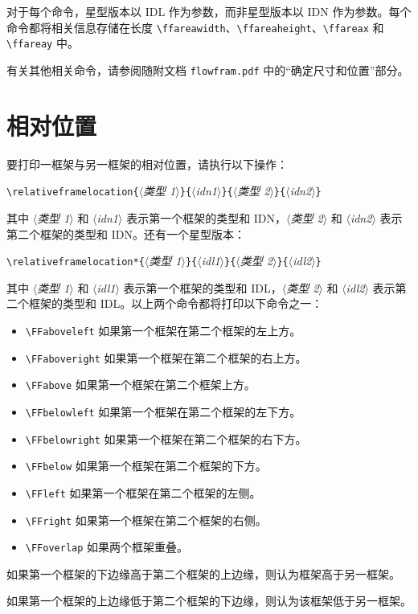 \documentclass[a4paper]{book}%
\newcommand{\filename}[1]{\texttt{#1}}
\newcommand{\meta}[1]{\textnormal{\ensuremath{\langle}\makebox[0pt][l]{}\emph{#1}\makebox[0pt][l]{}\ensuremath{\rangle}}}
\begin{document}
对于每个命令，星型版本以 IDL 作为参数，而非星型版本以 IDN 作为参数。每个命令都将相关信息存储在长度 \verb|\ffareawidth|、\verb|\ffareaheight|、\verb|\ffareax| 和 \verb|\ffareay| 中。

有关其他相关命令，请参阅随附文档 \filename{flowfram.pdf} 中的“确定尺寸和位置”部分。
\section{相对位置}%
要打印一框架与另一框架的相对位置，请执行以下操作：
\begin{mdframed}
    \verb|\relativeframelocation{|\meta{类型 1}\verb|}{|\meta{idn1}\verb|}{|\meta{类型 2}\verb|}{|\meta{idn2}\verb|}|
\end{mdframed}
其中 \meta{类型 1} 和 \meta{idn1} 表示第一个框架的类型和 IDN，\meta{类型 2} 和 \meta{idn2} 表示第二个框架的类型和 IDN。还有一个星型版本：
\begin{mdframed}
    \verb|\relativeframelocation*{|\meta{类型 1}\verb|}{|\meta{idl1}\verb|}{|\meta{类型 2}\verb|}{|\meta{idl2}\verb|}|
\end{mdframed}
其中 \meta{类型 1} 和 \meta{idl1} 表示第一个框架的类型和 IDL，\meta{类型 2} 和 \meta{idl2} 表示第二个框架的类型和 IDL。以上两个命令都将打印以下命令之一：
\begin{itemize}
    \item \verb|\FFaboveleft| 如果第一个框架在第二个框架的左上方。
    \item \verb|\FFaboveright| 如果第一个框架在第二个框架的右上方。
    \item \verb|\FFabove| 如果第一个框架在第二个框架上方。
    \item \verb|\FFbelowleft| 如果第一个框架在第二个框架的左下方。
    \item \verb|\FFbelowright| 如果第一个框架在第二个框架的右下方。
    \item \verb|\FFbelow| 如果第一个框架在第二个框架的下方。
    \item \verb|\FFleft| 如果第一个框架在第二个框架的左侧。
    \item \verb|\FFright| 如果第一个框架在第二个框架的右侧。
    \item \verb|\FFoverlap| 如果两个框架重叠。
\end{itemize}

如果第一个框架的下边缘高于第二个框架的上边缘，则认为框架高于另一框架。

如果第一个框架的上边缘低于第二个框架的下边缘，则认为该框架低于另一框架。
\end{document}
